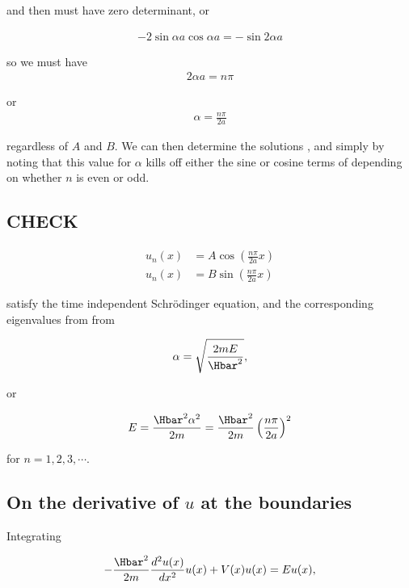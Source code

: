 and then must have zero determinant, or

\begin{align}\label{eqn:PHY356Lecture9:11}
-2 \sin\alpha a \cos\alpha a = -\sin 2 \alpha a
\end{align}

so we must have
\begin{align*}
2 \alpha a = n \pi
\end{align*}

or
\begin{align*}
\alpha = \frac{n \pi}{2a}
\end{align*}

regardless of $A$ and $B$.  We can then determine the solutions , and  simply by noting that this value for $\alpha$ kills off either the sine or cosine terms of  depending on whether $n$ is even or odd.

\subsection{CHECK}

\begin{align*}
u_n(x) &= A \cos \left( \frac{n \pi}{2 a} x \right) \\
u_n(x) &= B \sin \left( \frac{n \pi}{2 a} x \right)
\end{align*}

satisfy the time independent Schr\"{o}dinger equation, and the corresponding eigenvalues from from

\begin{align*}
\alpha = \sqrt{\frac{2 m E}{\Hbar^2}},
\end{align*}

or

\begin{align*}
E = \frac{\Hbar^2 \alpha^2}{2m} = \frac{\Hbar^2}{2m} \left( \frac{n \pi}{2a} \right)^2
\end{align*}

for $n = 1, 2, 3, \cdots$.

\subsection{On the derivative of \texorpdfstring{$u$}{u} at the boundaries}

Integrating

\begin{align}\label{eqn:PHY356Lecture9:20}
-\frac{\Hbar^2 }{2m} \frac{d^2 u(x)}{dx^2} u(x) + V(x) u(x) = E u(x),
\end{align}

